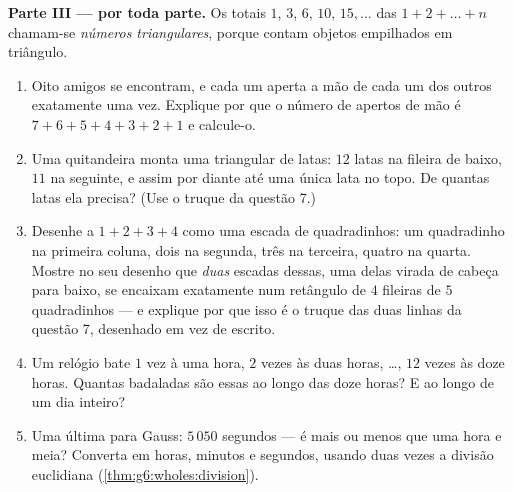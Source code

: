 \begin{problem}
\medskip
\noindent\textbf{Parte III ---  por toda parte.}
Os totais $1$, $3$, $6$, $10$, $15, \dots$ das 
$1 + 2 + \dots + n$ chamam-se \emph{números
triangulares}, porque contam objetos
empilhados em triângulo.
\begin{enumerate}[resume]
  \item Oito amigos se encontram, e cada um aperta a mão de cada um dos
        outros exatamente uma vez. Explique por que o número de apertos
        de mão é $7 + 6 + 5 + 4 + 3 + 2 + 1$ e calcule-o.
  \item Uma quitandeira monta uma  triangular de latas: $12$
        latas na fileira de baixo, $11$ na seguinte, e assim por diante
        até uma única lata no topo. De quantas latas ela precisa? (Use o
        truque da questão 7.)
  \item Desenhe a  $1 + 2 + 3 + 4$ como uma escada de quadradinhos:
        um quadradinho na primeira coluna, dois na segunda, três na
        terceira, quatro na quarta. Mostre no seu desenho que
        \emph{duas} escadas dessas, uma delas virada de cabeça para
        baixo, se encaixam exatamente num retângulo de $4$ fileiras de
        $5$ quadradinhos --- e explique por que isso é o truque das duas
        linhas da questão 7, desenhado em vez de escrito.
  \item Um relógio bate $1$ vez à uma hora, $2$ vezes às duas horas,
        \dots, $12$ vezes às doze horas. Quantas badaladas são essas ao
        longo das doze horas? E ao longo de um dia inteiro?
  \item Uma última para Gauss: $5\,050$ segundos --- é mais ou menos que
        uma hora e meia? Converta em horas, minutos e segundos, usando
        duas vezes a divisão euclidiana
        (\cref{thm:g6:wholes:division}).
\end{enumerate}
\end{problem}
